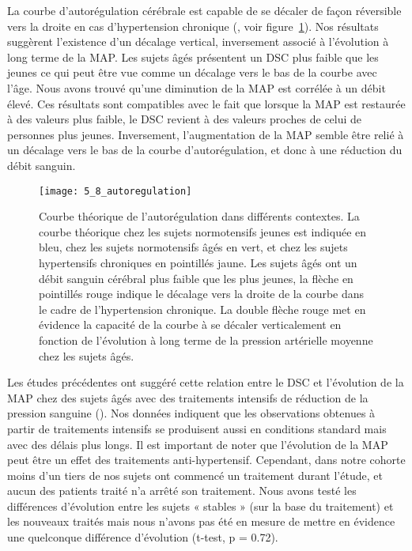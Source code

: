 La courbe d’autorégulation cérébrale est capable de se décaler de façon réversible vers la
droite en cas d’hypertension chronique (\cite{Traon2002}, voir figure~\ref{fig:5_8_autoregulation}). Nos résultats suggèrent l’existence d’un
décalage vertical, inversement associé à l’évolution à long terme de la MAP. Les sujets âgés présentent
un DSC plus faible que les jeunes ce qui peut être vue comme un décalage vers le bas de la courbe avec
l’âge. Nous avons trouvé qu’une diminution de la MAP est corrélée à un débit élevé. Ces résultats sont
compatibles avec le fait que lorsque la MAP est restaurée à des valeurs plus faible, le DSC revient à des
valeurs proches de celui de personnes plus jeunes. Inversement, l’augmentation de la MAP semble
être relié à un décalage vers le bas de la courbe d’autorégulation, et donc à une réduction du débit
sanguin.\\
\begin{figure}[!t]
\centering
\texttt{[image: 5\_8\_autoregulation]}
\caption{Courbe théorique de l'autorégulation dans différents contextes. La courbe théorique chez les sujets normotensifs
jeunes est indiquée en bleu, chez les sujets normotensifs âgés en vert, et chez les sujets hypertensifs chroniques en pointillés
jaune. Les sujets âgés ont un débit sanguin cérébral plus faible que les plus jeunes, la flèche en pointillés rouge indique le
décalage vers la droite de la courbe dans le cadre de l’hypertension chronique. La double flèche rouge met en évidence la
capacité de la courbe à se décaler verticalement en fonction de l’évolution à long terme de la pression artérielle moyenne
chez les sujets âgés.}
\label{fig:5_8_autoregulation}	
\end{figure}
Les études précédentes ont suggéré cette relation entre le DSC et l’évolution de la MAP chez
des sujets âgés avec des traitements intensifs de réduction de la pression sanguine (\cite{Tryambake2013}). Nos données
indiquent que les observations obtenues à partir de traitements intensifs se produisent aussi en
conditions standard mais avec des délais plus longs. Il est important de noter que l’évolution de la MAP
peut être un effet des traitements anti-hypertensif. Cependant, dans notre cohorte moins d’un tiers
de nos sujets ont commencé un traitement durant l’étude, et aucun des patients traité n’a arrêté son
traitement. Nous avons testé les différences d’évolution entre les sujets « stables » (sur la base du
traitement) et les nouveaux traités mais nous n’avons pas été en mesure de mettre en évidence une
quelconque différence d’évolution (t-test, p = 0.72).

